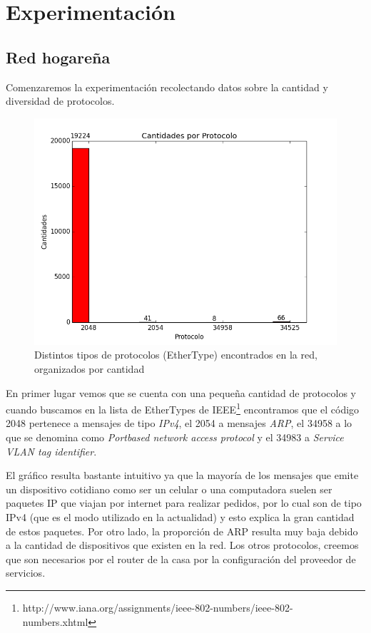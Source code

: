 \section{Experimentaci\'on}

\subsection{Red hogare\~na}

Comenzaremos la experimentaci\'on recolectando datos sobre la cantidad y diversidad de protocolos.

\begin{figure}[h!]
\centering
\includegraphics[width=0.7\linewidth]{imagenes/exp1/1cantidadProtocolo}
\caption{Distintos tipos de protocolos (EtherType) encontrados en la red, organizados por cantidad}
\label{exp1grafico1}
\end{figure}

En primer lugar vemos que se cuenta con una peque\~na cantidad de protocolos y cuando buscamos en la lista de EtherTypes de IEEE\footnote{http://www.iana.org/assignments/ieee-802-numbers/ieee-802-numbers.xhtml} encontramos que el c\'odigo 2048 pertenece a mensajes de tipo \textit{IPv4}, el 2054 a mensajes \textit{ARP}, el 34958 a lo que se denomina como \textit{Portbased network access protocol} y el 34983 a \textit{Service VLAN tag identifier}.\newline

El gr\'afico resulta bastante intuitivo ya que la mayor\'ia de los mensajes que emite un dispositivo cotidiano como ser un celular o una computadora suelen ser paquetes IP que viajan por internet para realizar pedidos, por lo cual son de tipo IPv4 (que es el modo utilizado en la actualidad) y esto explica la gran cantidad de estos paquetes. Por otro lado, la proporci\'on de ARP resulta muy baja debido a la cantidad de dispositivos que existen en la red. Los otros protocolos, creemos que son necesarios por el router de la casa por la configuraci\'on del proveedor de servicios.


